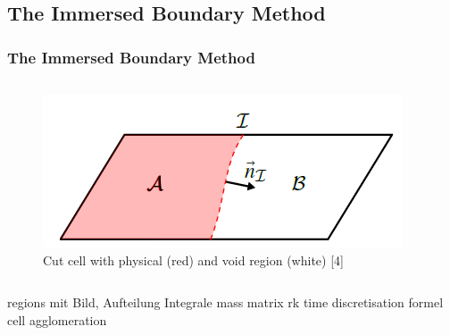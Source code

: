 	\subsection{The Immersed Boundary Method}
	\begin{frame}
		\frametitle{The Immersed Boundary Method}
		\begin{columns}[t]
			\column[]{7cm}
			\column[]{5cm}
			\begin{figure}[htbp]
				\vspace{-1cm}
				\includegraphics[width=\textwidth]{img/ibmcut.PNG}
				\caption{Cut cell with physical (red) and void region (white) [4]}\label{fig:cutcell}
			\end{figure} 
		\end{columns}
		regions mit Bild, Aufteilung Integrale
		mass matrix
		rk time discretisation formel
		cell agglomeration
	\end{frame}
